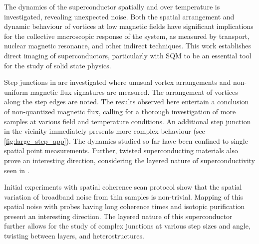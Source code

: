 The dynamics of the superconductor spatially and over temperature is investigated, revealing unexpected noise. Both the spatial arrangement and dynamic behaviour of vortices at low magnetic fields have significant implications for the collective macroscopic response of the system, as measured by transport, nuclear magnetic resonance, and other indirect techniques. This work establishes direct imaging of superconductors, particularly with \gls{SQM} to be an essential tool for the study of solid state physics.

Step junctions in  are investigated where unusual vortex arrangements and non-uniform magnetic flux signatures are measured. The arrangement of vortices along the step edges are noted. The results observed here entertain a conclusion of non-quantized magnetic flux, calling for a thorough investigation of more samples at various field and temperature conditions. An additional step junction in the vicinity immediately presents more complex behaviour (see \cref{fig:large_step_app}). The dynamics studied so far have been confined to single spatial point measurements. Further, twisted superconducting materials also prove an interesting direction, considering the layered nature of superconductivity seen in .

Initial experiments with spatial coherence scan protocol show that the spatial variation of broadband noise from thin samples is non-trivial. Mapping of this spatial noise with probes having long coherence times and isotopic purification present an interesting direction. The layered nature of this superconductor further allows for the study of complex junctions at various step sizes and angle, twisting between layers, and heterostructures. 